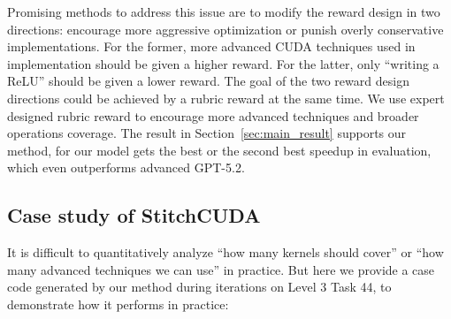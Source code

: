Promising methods to address this issue are to modify the reward design in two directions: encourage more aggressive optimization or punish overly conservative implementations. For the former, more advanced CUDA techniques used in implementation should be given a higher reward. For the latter, only “writing a ReLU” should be given a lower reward. The goal of the two reward design directions could be achieved by a rubric reward at the same time. We use expert designed rubric reward to encourage more advanced techniques and broader operations coverage. The result in Section~\ref{sec:main_result} supports our method, for our model gets the best or the second best speedup in evaluation, which even outperforms advanced GPT-5.2. 

\subsection{Case study of StitchCUDA}
\label{app:case}
It is difficult to quantitatively analyze “how many kernels should cover” or “how many advanced techniques we can use” in practice. But here we provide a case code generated by our method during iterations on Level 3 Task 44, to demonstrate how it performs in practice:

